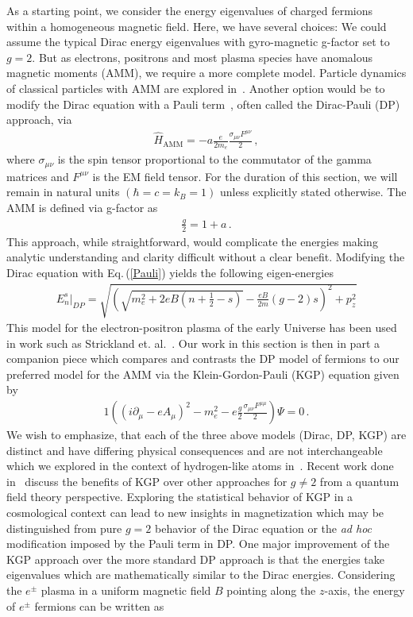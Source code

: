 \documentclass[universe,article,submit,moreauthors,pdftex,a4paper]{Definitions/mdpi}
\newcommand{\req}[1]{Eq.\,(\ref{#1})}
\newcommand*{\xblue}{\color{black}}
\begin{document}
As a starting point, we consider the energy eigenvalues of charged fermions within a homogeneous magnetic field. Here, we have several choices: We could assume the typical Dirac energy eigenvalues with gyro-magnetic g-factor set to $g=2$. But as electrons, positrons and most plasma species have anomalous magnetic moments (AMM), we require a more complete model. {\xblue Particle dynamics of classical particles with AMM are explored in~\cite{Rafelski:2017hce,Formanek:2017mbv,Formanek:2020zwc,Formanek:2021mcp}.} Another option would be to modify the Dirac equation with a Pauli term~\cite{thaller2013dirac}, often called the Dirac-Pauli (DP) approach, via
\begin{align}
 \label{Pauli} \hat{H}_{\mathrm{AMM}} = -a\frac{e}{2m_{e}}\frac{\sigma_{\mu\nu}F^{\mu\nu}}{2}\,,
\end{align}
where $\sigma_{\mu\nu}$ is the spin tensor proportional to the commutator of the gamma matrices and $F^{\mu\nu}$ is the EM field tensor. For the duration of this section, we will remain in natural units $(\hbar=c=k_{B}=1)$ unless explicitly stated otherwise. The AMM is defined via g-factor as
\begin{align}
 \label{AMM} \frac{g}{2}=1+a\,.
\end{align}
This approach, while straightforward, would complicate the energies making analytic understanding and clarity difficult without a clear benefit. Modifying the Dirac equation with \req{Pauli} yields the following eigen-energies
\begin{align}
 \label{DPEnergy} E_{n}^{s}\vert_{DP}=\sqrt{\left(\sqrt{m_{e}^{2}+2eB\left(n+\frac{1}{2}-s\right)}-\frac{eB}{2m}(g-2)s\right)^{2}+p_{z}^{2}}
\end{align}
This model for the electron-positron plasma of the early Universe has been used in work such as Strickland et. al.~\cite{Strickland:2012vu}. Our work in this section is then in part a companion piece which compares and contrasts the DP model of fermions to our preferred model for the AMM via the Klein-Gordon-Pauli (KGP) equation given by
\begin{alignat}{1}
 \label{KGP} \left(\left(i\partial_{\mu}-eA_{\mu}\right)^{2}-m_{e}^{2}-e\frac{g}{2}\frac{\sigma_{\mu\nu}F^{\mu\mu}}{2}\right)\Psi=0\,.
\end{alignat}
We wish to emphasize, that each of the three above models (Dirac, DP, KGP) are distinct and have differing physical consequences and are not interchangeable which we explored in the context of hydrogen-like atoms in~\cite{Steinmetz:2018ryf}. Recent work done in~\cite{rafelski2023study} discuss the benefits of KGP over other approaches for $g\neq2$ from a quantum field theory perspective. Exploring the statistical behavior of KGP in a cosmological context can lead to new insights in magnetization which may be distinguished from pure $g=2$ behavior of the Dirac equation or the \emph{ad hoc} modification imposed by the Pauli term in DP. One major improvement of the KGP approach over the more standard DP approach is that the energies take eigenvalues which are mathematically similar to the Dirac energies. Considering the $e^\pm$ plasma in a uniform magnetic field $B$ pointing along the $z$-axis, the energy of $e^\pm$ fermions can be written as
\end{document}
